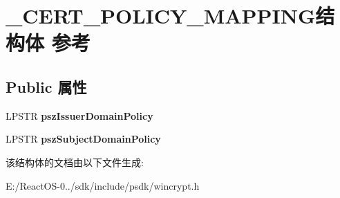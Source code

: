 \hypertarget{struct___c_e_r_t___p_o_l_i_c_y___m_a_p_p_i_n_g}{}\section{\+\_\+\+C\+E\+R\+T\+\_\+\+P\+O\+L\+I\+C\+Y\+\_\+\+M\+A\+P\+P\+I\+N\+G结构体 参考}
\label{struct___c_e_r_t___p_o_l_i_c_y___m_a_p_p_i_n_g}
\subsection*{Public 属性}
\begin{DoxyCompactItemize}
\item 
\mbox{\label{struct___c_e_r_t___p_o_l_i_c_y___m_a_p_p_i_n_g_a1e884fd42c4de6ea770dee86774105df}} 
L\+P\+S\+TR {\bfseries psz\+Issuer\+Domain\+Policy}
\item 
\mbox{\label{struct___c_e_r_t___p_o_l_i_c_y___m_a_p_p_i_n_g_af279ab167bbed5cc08e49bc18ac7743c}} 
L\+P\+S\+TR {\bfseries psz\+Subject\+Domain\+Policy}
\end{DoxyCompactItemize}


该结构体的文档由以下文件生成\+:\begin{DoxyCompactItemize}
\item 
E\+:/\+React\+O\+S-\/0../sdk/include/psdk/wincrypt.\+h\end{DoxyCompactItemize}
